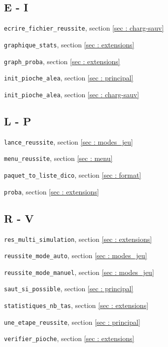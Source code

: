 \documentclass[titlepage]{article}
\begin{document}
\subsection*{E - I}
\begin{description}
\item \texttt{ecrire\_fichier\_reussite}, section \ref{sec : charg-sauv}
\item \texttt{graphique\_stats}, section \ref{sec : extensions}
\item \texttt{graph\_proba}, section \ref{sec : extensions}
\item \texttt{init\_pioche\_alea}, section \ref{sec : principal}
\item \texttt{init\_pioche\_alea}, section \ref{sec : charg-sauv}
\end{description}

\subsection*{L - P}
\begin{description}
\item \texttt{lance\_reussite}, section \ref{sec : modes_jeu}
\item \texttt{menu\_reussite}, section \ref{sec : menu}
\item \texttt{paquet\_to\_liste\_dico}, section \ref{sec : format}
\item \texttt{proba}, section \ref{sec : extensions}
\end{description}

\subsection*{R - V}
\begin{description}
\item \texttt{res\_multi\_simulation}, section \ref{sec : extensions}
\item \texttt{reussite\_mode\_auto}, section \ref{sec : modes_jeu}
\item \texttt{reussite\_mode\_manuel}, section \ref{sec : modes_jeu}
\item \texttt{saut\_si\_possible}, section \ref{sec : principal}
\item \texttt{statistiques\_nb\_tas}, section \ref{sec : extensions}
\item \texttt{une\_etape\_reussite}, section \ref{sec : principal}
\item \texttt{verifier\_pioche}, section \ref{sec : extensions}
\end{description}
\end{document}
